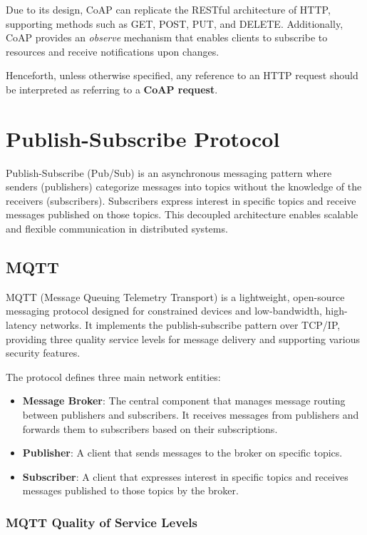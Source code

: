 Due to its design, CoAP can replicate the RESTful architecture of HTTP, supporting methods such as GET, POST, PUT, and DELETE. Additionally, CoAP provides an \textit{observe} mechanism that enables clients to subscribe to resources and receive notifications upon changes.

Henceforth, unless otherwise specified, any reference to an HTTP request should be interpreted as referring to a \textbf{CoAP request}.

\section{Publish-Subscribe Protocol}
Publish-Subscribe (Pub/Sub) is an asynchronous messaging pattern where senders (publishers) categorize messages into topics without the knowledge of the receivers (subscribers). Subscribers express interest in specific topics and receive messages published on those topics. This decoupled architecture enables scalable and flexible communication in distributed systems.

\subsection{MQTT} \label{sec:mqtt}
MQTT (Message Queuing Telemetry Transport) is a lightweight, open-source messaging protocol designed for constrained devices and low-bandwidth, high-latency networks. It implements the publish-subscribe pattern over TCP/IP, providing three quality service levels for message delivery and supporting various security features.

The protocol defines three main network entities:
\begin{itemize}
    \item \textbf{Message Broker}: The central component that manages message routing between publishers and subscribers. It receives messages from publishers and forwards them to subscribers based on their subscriptions.
    \item \textbf{Publisher}: A client that sends messages to the broker on specific topics. 
    \item \textbf{Subscriber}: A client that expresses interest in specific topics and receives messages published to those topics by the broker.
\end{itemize}

\subsubsection{MQTT Quality of Service Levels}

